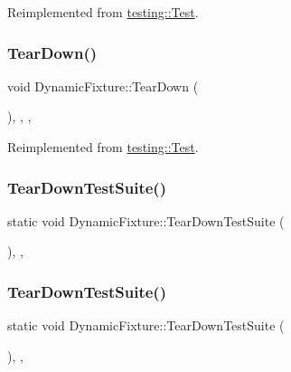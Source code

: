 Reimplemented from \mbox{\hyperlink{classtesting_1_1_test_a5f0ab439802cbe0ef7552f1a9f791923}{testing\+::\+Test}}.

\mbox{\label{class_dynamic_fixture_a10e8ae5b963b80a99ad8892bc4974aac}} 
\subsubsection{\texorpdfstring{TearDown()}{TearDown()}\hspace{0.1cm}{\footnotesize\ttfamily [2/2]}}
{\footnotesize\ttfamily void Dynamic\+Fixture\+::\+Tear\+Down (\begin{DoxyParamCaption}{ }\end{DoxyParamCaption})\hspace{0.3cm}{\ttfamily [inline]}, {\ttfamily [override]}, {\ttfamily [protected]}, {\ttfamily [virtual]}}



Reimplemented from \mbox{\hyperlink{classtesting_1_1_test_a5f0ab439802cbe0ef7552f1a9f791923}{testing\+::\+Test}}.

\mbox{\label{class_dynamic_fixture_a907d5981006ea512b9cf3f7819583fc0}} 
\subsubsection{\texorpdfstring{TearDownTestSuite()}{TearDownTestSuite()}\hspace{0.1cm}{\footnotesize\ttfamily [1/2]}}
{\footnotesize\ttfamily static void Dynamic\+Fixture\+::\+Tear\+Down\+Test\+Suite (\begin{DoxyParamCaption}{ }\end{DoxyParamCaption})\hspace{0.3cm}{\ttfamily [inline]}, {\ttfamily [static]}, {\ttfamily [protected]}}

\mbox{\label{class_dynamic_fixture_a907d5981006ea512b9cf3f7819583fc0}} 
\subsubsection{\texorpdfstring{TearDownTestSuite()}{TearDownTestSuite()}\hspace{0.1cm}{\footnotesize\ttfamily [2/2]}}
{\footnotesize\ttfamily static void Dynamic\+Fixture\+::\+Tear\+Down\+Test\+Suite (\begin{DoxyParamCaption}{ }\end{DoxyParamCaption})\hspace{0.3cm}{\ttfamily [inline]}, {\ttfamily [static]}, {\ttfamily [protected]}}



